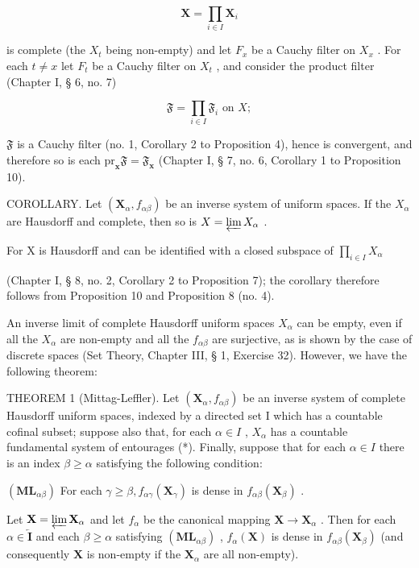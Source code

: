 \[
\mathbf {X} = \prod_ {i \in I} \mathbf {X} _ {i}
\]

is complete (the \(X_{t}\) being non-empty) and let \(F_{x}\) be a Cauchy filter on \(X_{x}\) . For each \(t \neq x\) let \(F_{t}\) be a Cauchy filter on \(X_{t}\) , and consider the product filter (Chapter I, § 6, no. 7)

\[
\mathfrak {F} = \prod_ {i \in I} \mathfrak {F} _ {i} \text { on } X;
\]

\(\mathfrak{F}\) is a Cauchy filter (no. 1, Corollary 2 to Proposition 4), hence is convergent, and therefore so is each \(\mathrm{pr}_{\mathbf{x}}\mathfrak{F} = \mathfrak{F}_{\mathbf{x}}\) (Chapter I, § 7, no. 6, Corollary 1 to Proposition 10).

COROLLARY. Let \((\mathbf{X}_{\alpha}, f_{\alpha\beta})\) be an inverse system of uniform spaces. If the \(X_{\alpha}\) are Hausdorff and complete, then so is \(X = \varprojlim X_{\alpha}\) .

For X is Hausdorff and can be identified with a closed subspace of \(\prod_{i\in I}X_{\alpha}\)

(Chapter I, § 8, no. 2, Corollary 2 to Proposition 7); the corollary therefore follows from Proposition 10 and Proposition 8 (no. 4).

An inverse limit of complete Hausdorff uniform spaces \(X_{\alpha}\) can be empty, even if all the \(X_{\alpha}\) are non-empty and all the \(f_{\alpha\beta}\) are surjective, as is shown by the case of discrete spaces (Set Theory, Chapter III, § 1, Exercise 32). However, we have the following theorem:

THEOREM 1 (Mittag-Leffler). Let \((\mathbf{X}_{\alpha}, f_{\alpha\beta})\) be an inverse system of complete Hausdorff uniform spaces, indexed by a directed set I which has a countable cofinal subset; suppose also that, for each \(\alpha \in I\) , \(X_{\alpha}\) has a countable fundamental system of entourages (*). Finally, suppose that for each \(\alpha \in I\) there is an index \(\beta \geqslant \alpha\) satisfying the following condition:

\((\mathbf{ML}_{\alpha \beta})\) For each \(\gamma \geqslant \beta, f_{\alpha \gamma}(\mathbf{X}_{\gamma})\) is dense in \(f_{\alpha \beta}(\mathbf{X}_{\beta})\) .

Let \(\mathbf{X} = \varprojlim \mathbf{X}_{\alpha}\) and let \(f_{\alpha}\) be the canonical mapping \(\mathbf{X} \to \mathbf{X}_{\alpha}\) . Then for each \(\alpha \in \overleftarrow{\mathbf{I}}\) and each \(\beta \geqslant \alpha\) satisfying \((\mathbf{ML}_{\alpha\beta})\) , \(f_{\alpha}(\mathbf{X})\) is dense in \(f_{\alpha\beta}(\mathbf{X}_{\beta})\) (and consequently \(\mathbf{X}\) is non-empty if the \(\mathbf{X}_{\alpha}\) are all non-empty).

